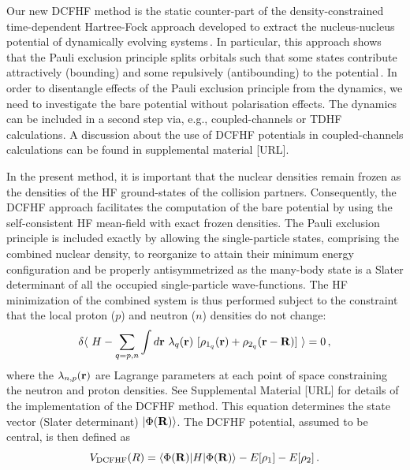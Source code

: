 Our new DCFHF method is the static counter-part of the density-constrained time-dependent Hartree-Fock
approach developed to extract the nucleus-nucleus potential of dynamically evolving systems\,\citep{umar2006b}.
In particular, this approach shows that the Pauli exclusion principle splits orbitals such that some
states contribute attractively (bounding) and some repulsively (antibounding) to the potential\,\citep{umar2012b}.
In order to disentangle effects of the Pauli exclusion principle from the dynamics, we need to investigate
the bare potential without polarisation effects.
The dynamics can be included in a second step via, e.g., coupled-channels  
\citep{simenel2013b} or TDHF~\citep{washiyama2008,simenel2013a,umar2014a} calculations.
A discussion about the use of DCFHF potentials in coupled-channels calculations 
can be found in supplemental material [URL]. 

In the present method, it is important that the nuclear densities remain frozen as the densities
of the HF ground-states of the collision partners.
Consequently, the DCFHF approach facilitates the computation of the bare potential 
by using the self-consistent HF mean-field with exact frozen densities.
The Pauli exclusion principle is included exactly by allowing the single-particle states, 
comprising the combined nuclear density, to reorganize
to attain their minimum energy configuration and be properly antisymmetrized as the many-body
state is a Slater determinant of all the occupied single-particle wave-functions.
The HF minimization of the combined system is thus performed subject to the constraint that the
local proton ($p$) and neutron ($n$) densities do not change:
\begin{equation}
\delta \< \ H - \sum_{q=p,n}\int d\vr \ \lambda_q(\vr) \ [\rho_{1_q}(\vr)+\rho_{2_q}(\vr-\vR)] \ \> = 0\,,
\end{equation}
where the $\lambda_{n,p}({\bf r})$ are Lagrange parameters at each point 
of space constraining the neutron and proton densities.
See Supplemental Material [URL] for details of the implementation of the DCFHF method.
This equation determines the state vector (Slater determinant) $|\Phi({\bf R})\rangle$.
The DCFHF potential, assumed to be central, is then defined as
\begin{equation}
V_{\mathrm{DCFHF}}(R)=\langle\Phi({\bf R}) | H | \Phi({\bf R}) \rangle-E[\rho_1]-E[\rho_2]\,.
\end{equation}

